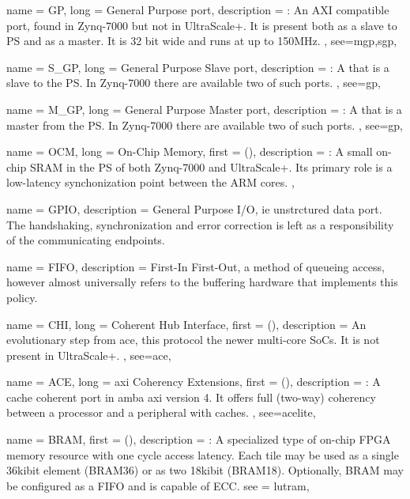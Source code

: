 {
	name = {GP},
	long = {General Purpose port},
	description = {\emph{}:
		An AXI compatible port, found in Zynq-7000 but not in UltraScale+.
		It is present both as a slave to PS and as a master. 
		It is 32 bit wide and runs at up to 150MHz.
	},
	see={mgp,sgp},
}

{
	name = {S\_GP},
	long = {General Purpose Slave port},
	description = {\emph{}:
		A  that is a slave to the PS. 
		In Zynq-7000 there are available two of such ports.
	},
	see={gp},
}

{
	name = {M\_GP},
	long = {General Purpose Master port},
	description = {\emph{}:
		A  that is a master from the PS. 
		In Zynq-7000 there are available two of such ports.
	},
	see={gp},
}

{
	name = {OCM},
	long = {On-Chip Memory},
	first = { ()},
	description = {\emph{}:
		A small on-chip SRAM in the PS of both Zynq-7000 and UltraScale+.
		Its primary role is a low-latency synchonization point between the ARM cores.
	},
}

{
	name = {GPIO},
	description = {
		General Purpose I/O, ie unstrctured data port. 
		The handshaking, synchronization and error correction
		is left as a responsibility of the communicating endpoints.
	}
}

{
	name = {FIFO},
	description = {
		First-In First-Out, a method of queueing access,
		however almost universally refers to the buffering hardware
		that implements this policy.
	}
}


{
	name = {CHI},
	long = {Coherent Hub Interface},
	first = { ()},
	description = {
		An evolutionary step from \gls{ace}, this protocol the newer multi-core SoCs.
		It is not present in UltraScale+.
	},
	see={ace},
}

{
	name = {ACE},
	long = {\gls{axi} Coherency Extensions},
	first = { ()},
	description = {\emph{}:
		A cache coherent port in \gls{amba} \gls{axi} version 4. It offers full (two-way)
		coherency between a processor and a peripheral with caches.
	},
	see={acelite},
}

{
	name = {BRAM},
	first = { ()},
	description = {\emph{}:
		A specialized type of on-chip FPGA memory resource with one cycle access latency.
		Each tile may be used as a single 36kibit element (BRAM36) or as two 18kibit (BRAM18).
		Optionally, BRAM may be configured as a FIFO and is capable of ECC.
	}
	see = {lutram},
}

